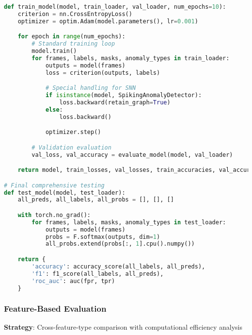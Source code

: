 \documentclass[11pt,a4paper]{article}
\begin{document}
\begin{lstlisting}[language=Python, caption=Architecture-Based Evaluation]
def train_model(model, train_loader, val_loader, num_epochs=10):
    criterion = nn.CrossEntropyLoss()
    optimizer = optim.Adam(model.parameters(), lr=0.001)

    for epoch in range(num_epochs):
        # Standard training loop
        model.train()
        for frames, labels, masks, anomaly_types in train_loader:
            outputs = model(frames)
            loss = criterion(outputs, labels)

            # Special handling for SNN
            if isinstance(model, SpikingAnomalyDetector):
                loss.backward(retain_graph=True)
            else:
                loss.backward()

            optimizer.step()

        # Validation evaluation
        val_loss, val_accuracy = evaluate_model(model, val_loader)

    return model, train_losses, val_losses, train_accuracies, val_accuracies

# Final comprehensive testing
def test_model(model, test_loader):
    all_preds, all_labels, all_probs = [], [], []

    with torch.no_grad():
        for frames, labels, masks, anomaly_types in test_loader:
            outputs = model(frames)
            probs = F.softmax(outputs, dim=1)
            all_probs.extend(probs[:, 1].cpu().numpy())

    return {
        'accuracy': accuracy_score(all_labels, all_preds),
        'f1': f1_score(all_labels, all_preds),
        'roc_auc': auc(fpr, tpr)
    }
\end{lstlisting}

\subsubsection{Feature-Based Evaluation}
\textbf{Strategy}: Cross-feature-type comparison with computational efficiency analysis
\end{document}
